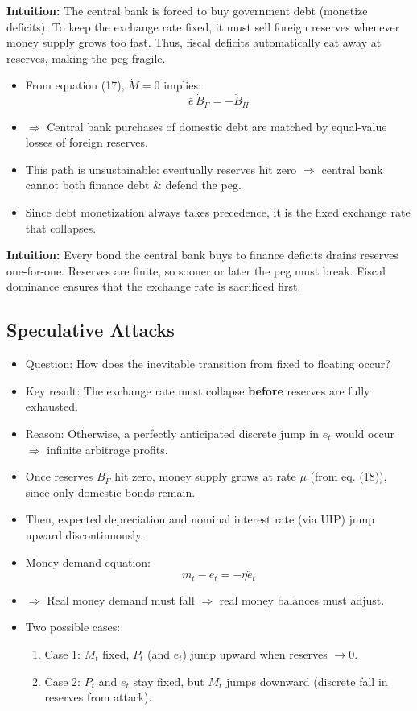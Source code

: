 \documentclass[12pt]{article}
\begin{document}
\noindent\textbf{Intuition:}  
The central bank is forced to buy government debt (monetize deficits). To keep the exchange rate fixed, it must sell foreign reserves whenever money supply grows too fast. Thus, fiscal deficits automatically eat away at reserves, making the peg fragile.

\begin{itemize}
    \item From equation (17), $\dot{M} = 0$ implies:
    \[
        \bar{e}\,\dot{B}_F = -\dot{B}_H
    \]
    \item $\Rightarrow$ Central bank purchases of domestic debt are matched by equal-value losses of foreign reserves.
    \item This path is unsustainable: eventually reserves hit zero $\Rightarrow$ central bank cannot both finance debt \& defend the peg.
    \item Since debt monetization always takes precedence, it is the fixed exchange rate that collapses.
\end{itemize}

\noindent\textbf{Intuition:}  
Every bond the central bank buys to finance deficits drains reserves one-for-one. Reserves are finite, so sooner or later the peg must break. Fiscal dominance ensures that the exchange rate is sacrificed first.

\subsection*{\noindent\textbf{Speculative Attacks}}

\begin{itemize}
    \item Question: How does the inevitable transition from fixed to floating occur?
    \item Key result: The exchange rate must collapse \textbf{before} reserves are fully exhausted.
    \item Reason: Otherwise, a perfectly anticipated discrete jump in $e_t$ would occur $\Rightarrow$ infinite arbitrage profits.
    \item Once reserves $B_F$ hit zero, money supply grows at rate $\mu$ (from eq. (18)), since only domestic bonds remain.
    \item Then, expected depreciation and nominal interest rate (via UIP) jump upward discontinuously.
    \item Money demand equation: 
    \[
        m_t - e_t = -\eta \dot{e}_t
    \]
    \item $\Rightarrow$ Real money demand must fall $\Rightarrow$ real money balances must adjust.
    \item Two possible cases:
    \begin{enumerate}
        \item Case 1: $M_t$ fixed, $P_t$ (and $e_t$) jump upward when reserves $\to 0$.
        \item Case 2: $P_t$ and $e_t$ stay fixed, but $M_t$ jumps downward (discrete fall in reserves from attack).
    \end{enumerate}
\end{itemize}
\end{document}
